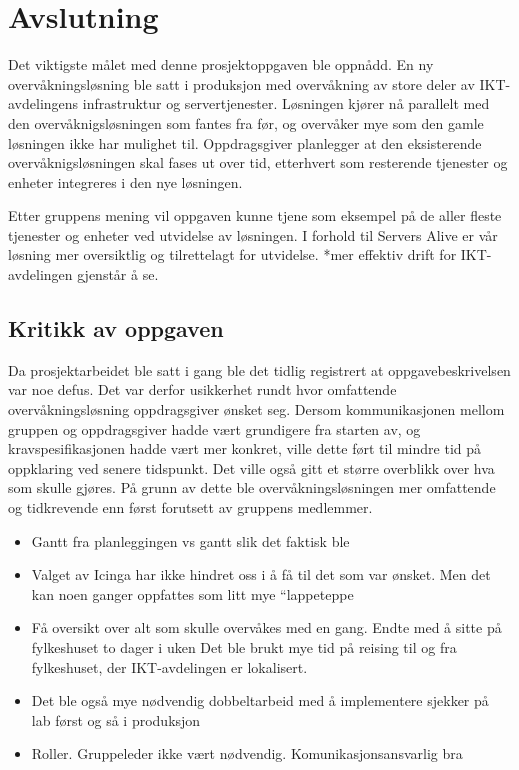 \chapter{Avslutning}
Det viktigste målet med denne prosjektoppgaven ble oppnådd. En ny overvåkningsløsning ble satt i produksjon med overvåkning av store deler av IKT-avdelingens infrastruktur og servertjenester. Løsningen kjører nå parallelt med den overvåknigsløsningen som fantes fra før, og overvåker mye som den gamle løsningen ikke har mulighet til. Oppdragsgiver planlegger at den eksisterende overvåknigsløsningen skal fases ut over tid, etterhvert som resterende tjenester og enheter integreres i den nye løsningen. 

Etter gruppens mening vil oppgaven kunne tjene som eksempel på de aller fleste tjenester og enheter ved utvidelse av løsningen. I forhold til Servers Alive er vår løsning mer oversiktlig og tilrettelagt for utvidelse. 
*mer effektiv drift for IKT-avdelingen gjenstår å se.

\section{Kritikk av oppgaven}
Da prosjektarbeidet ble satt i gang ble det tidlig registrert at oppgavebeskrivelsen var noe defus. Det var derfor usikkerhet rundt hvor omfattende overvåkningsløsning oppdragsgiver ønsket seg. Dersom kommunikasjonen mellom gruppen og oppdragsgiver hadde vært grundigere fra starten av, og kravspesifikasjonen hadde vært mer konkret, ville dette ført til mindre tid på oppklaring ved senere tidspunkt. Det ville også gitt et større overblikk over hva som skulle gjøres. På grunn av dette ble overvåkningsløsningen mer omfattende og tidkrevende enn først forutsett av gruppens medlemmer.

\begin{itemize}
	\item Gantt fra planleggingen vs gantt slik det faktisk ble
	\item Valget av Icinga har ikke hindret oss i å få til det som var ønsket. Men det kan noen ganger oppfattes som litt mye “lappeteppe
	\item Få oversikt over alt som skulle overvåkes med en gang. Endte med å sitte på fylkeshuset to dager i uken 
Det ble brukt mye tid på reising til og fra fylkeshuset, der IKT-avdelingen er lokalisert. 
	\item Det ble også mye nødvendig dobbeltarbeid med å implementere sjekker på lab først og så i produksjon
	\item Roller. Gruppeleder ikke vært nødvendig. Komunikasjonsansvarlig bra
\end{itemize}

